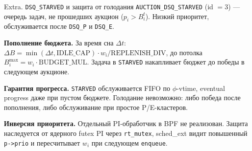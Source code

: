 \documentclass[aspectratio=169,11pt]{beamer}
\begin{document}
\begin{frame}{Extra. \texttt{DSQ\_STARVED} и защита от голодания}
        \scriptsize
        \texttt{AUCTION\_DSQ\_STARVED} (id $= 3$) — очередь задач, не
        прошедших аукцион ($p_i > B_i^t$). Низкий приоритет,
        обслуживается после \texttt{DSQ\_P} и \texttt{DSQ\_E}.

        \vspace{0.2em}
        \begin{shadowbox2}
                \textbf{Пополнение бюджета.}
                За время сна $\Delta t$:
                $\Delta B = \min(\Delta t, \text{IDLE\_CAP}) \cdot w_i /
                \text{REPLENISH\_DIV}$, до потолка $B_i^{\max} = w_i
                \cdot \text{BUDGET\_MUL}$. Задача в \texttt{STARVED}
                накапливает бюджет до победы в следующем аукционе.
        \end{shadowbox2}

        \vspace{0.2em}
        \begin{shadowbox2}
                \textbf{Гарантия прогресса.}
                \texttt{STARVED} обслуживается FIFO по $\phi$-vtime,
                eventual progress даже при пустом бюджете. Голодание
                невозможно: либо победа после пополнения, либо
                обслуживание при простое P/E-кластеров.
        \end{shadowbox2}

        \vspace{0.2em}
        \begin{shadowbox}
                \textbf{Инверсия приоритета.}
                Отдельный PI-обработчик в BPF не реализован. Защита
                наследуется от ядерного futex PI через \texttt{rt\_mutex},
                sched\_ext видит повышенный \texttt{p->prio} и
                пересчитывает $w_i$ при следующем \texttt{enqueue}.
        \end{shadowbox}
\end{frame}
\addtocounter{framenumber}{-1}
\end{document}
